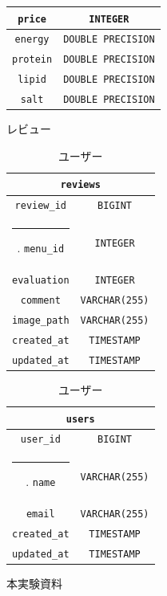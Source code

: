 \documentclass[a4paper]{ltjsarticle}
\makeatletter
\def\Hline{
    \noalign{\ifnum0=`}\fi\hrule \@height 3.\arrayrulewidth \futurelet
    \reserved@a\@xhline}
\makeatother
\begin{document}
\begin{table}[h]
\begin{minipage}[t]{.49\textwidth}
\begin{tabular}{|c|c|}
                    \verb|price| & \verb|INTEGER| \\ \hline
                    \verb|energy| & \verb|DOUBLE PRECISION| \\ \hline
                    \verb|protein| & \verb|DOUBLE PRECISION| \\ \hline
                    \verb|lipid| & \verb|DOUBLE PRECISION| \\ \hline
                    \verb|salt| & \verb|DOUBLE PRECISION| \\ \hline
                \end{tabular}
            \end{minipage}
        \end{table}
        \begin{table}[ht]
            \begin{minipage}[t]{.49\textwidth}
                \center
                \caption{レビュー}
                \label{reviews}
                \begin{tabular}{|c|c|}
                    \hline
                    \multicolumn{2}{|c|}{\texttt{reviews}} \\ \hline \hline
                    \verb|review_id| & \verb|BIGINT| \\ \Hline
                    \verb|menu_id| & \verb|INTEGER| \\ \hline
                    \verb|evaluation| & \verb|INTEGER| \\ \hline
                    \verb|comment| & \verb|VARCHAR(255)| \\ \hline
                    \verb|image_path| & \verb|VARCHAR(255)| \\ \hline
                    \verb|created_at| & \verb|TIMESTAMP| \\ \hline
                    \verb|updated_at| & \verb|TIMESTAMP| \\ \hline
                \end{tabular}
            \end{minipage}
            \begin{minipage}[t]{.49\textwidth}
                \center
                \caption{ユーザー}
                \label{users}
                \begin{tabular}{|c|c|}
                    \hline
                    \multicolumn{2}{|c|}{\texttt{users}} \\ \hline \hline
                    \verb|user_id| & \verb|BIGINT| \\ \Hline
                    \verb|name| & \verb|VARCHAR(255)| \\ \hline
                    \verb|email| & \verb|VARCHAR(255)| \\ \hline
                    \verb|created_at| & \verb|TIMESTAMP| \\ \hline
                    \verb|updated_at| & \verb|TIMESTAMP| \\ \hline
                \end{tabular}
            \end{minipage}
        \end{table}

\begin{thebibliography}{9}
     本実験資料
\end{thebibliography}
\end{document}
